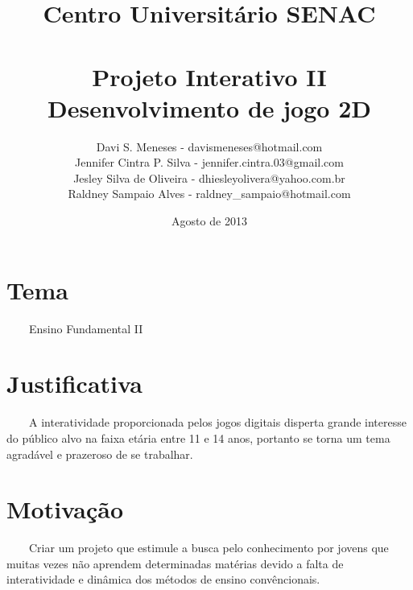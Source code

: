 \documentclass[a4paper,12pt]{article}%
\title{\bf Centro Universitário SENAC \\ \\ Projeto Interativo II \\ Desenvolvimento de jogo 2D}
\author{Davi S. Meneses - davismeneses@hotmail.com \\ Jennifer Cintra P. Silva - jennifer.cintra.03@gmail.com \\ Jesley Silva de Oliveira - dhiesleyolivera@yahoo.com.br \\ Raldney Sampaio Alves - raldney{\_}sampaio@hotmail.com}
\date{Agosto de 2013}
\begin{document}
\maketitle{\textbf{}}
\section{Tema}


\ \ \ \ Ensino Fundamental II


\section{Justificativa}
\ \ \ \ A interatividade proporcionada pelos jogos digitais disperta grande interesse do público alvo na faixa etária entre 11 e 14 anos, portanto se torna um tema agradável e prazeroso de se trabalhar.

\section{Motivação}

\ \ \ \ Criar um projeto que estimule a busca pelo conhecimento por jovens que muitas vezes não aprendem determinadas matérias devido a falta de interatividade e dinâmica dos métodos de ensino convêncionais.
\end{document}
